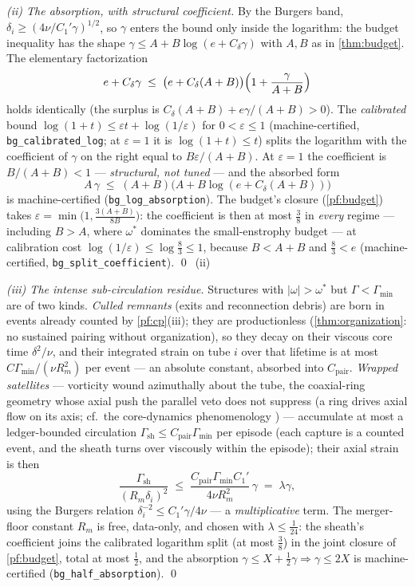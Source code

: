 \documentclass[11pt,letterpaper]{amsart}
\theoremstyle{definition}
\theoremstyle{remark}
\newcommand{\om}{\omega}
\newcommand{\abs}[1]{\lvert #1 \rvert}
\begin{document}
\emph{(ii) The absorption, with structural coefficient.} By the Burgers band,
$\delta_i\ge(4\nu/C_1'\gamma)^{1/2}$, so $\gamma$ enters the bound only inside the
logarithm: the budget inequality has the shape $\gamma\le A+B\log(e+C_\delta\gamma)$
with $A,B$ as in \cref{thm:budget}. The elementary factorization
\[
e+C_\delta\gamma\;\le\;\bigl(e+C_\delta(A+B)\bigr)\Bigl(1+\frac{\gamma}{A+B}\Bigr)
\]
holds identically (the surplus is $C_\delta(A+B)+e\gamma/(A+B)>0$). The
\emph{calibrated} bound $\log(1+t)\le\varepsilon t+\log(1/\varepsilon)$ for
$0<\varepsilon\le1$ (machine-certified, \texttt{bg\_calibrated\_log}; at
$\varepsilon=1$ it is $\log(1+t)\le t$) splits the logarithm with the coefficient
of $\gamma$ on the right equal to $B\varepsilon/(A+B)$. At $\varepsilon=1$ the
coefficient is $B/(A+B)<1$ --- \emph{structural, not tuned} --- and the absorbed form
\[
A\,\gamma\;\le\;(A+B)\bigl(A+B\log(e+C_\delta(A+B))\bigr)
\]
is machine-certified (\texttt{bg\_log\_absorption}). The budget's closure
(\cref{pf:budget}) takes $\varepsilon=\min\bigl(1,\tfrac{3(A+B)}{8B}\bigr)$: the
coefficient is then at most $\tfrac38$ in \emph{every} regime --- including $B>A$,
where $\om^*$ dominates the small-enstrophy budget --- at calibration cost
$\log(1/\varepsilon)\le\log\tfrac83\le1$, because $B<A+B$ and $\tfrac83<e$
(machine-certified, \texttt{bg\_split\_coefficient}). \qed\ (ii)

\emph{(iii) The intense sub-circulation residue.} Structures with
$\abs{\om}>\om^*$ but $\Gamma<\Gamma_{\min}$ are of two kinds. \emph{Culled remnants}
(exits and reconnection debris) are born in events already counted by
\cref{pf:cp}(iii); they are productionless (\cref{thm:organization}: no sustained
pairing without organization), so they decay on their viscous core time
$\delta^2/\nu$, and their integrated strain on tube $i$ over that lifetime is at most
$C\Gamma_{\min}/(\nu R_m^2)$ per event --- an absolute constant, absorbed into
$C_{\mathrm{pair}}$. \emph{Wrapped satellites} --- vorticity wound azimuthally about
the tube, the coaxial-ring geometry whose axial push the parallel veto does not
suppress (a ring drives axial flow on its axis; cf.\ the core-dynamics phenomenology
\cite{MelanderHussain1994}) --- accumulate at most a ledger-bounded circulation
$\Gamma_{\mathrm{sh}}\le C_{\mathrm{pair}}\Gamma_{\min}$ per episode (each capture is
a counted event, and the sheath turns over viscously within the episode); their
axial strain is then
\[
\frac{\Gamma_{\mathrm{sh}}}{(R_m\delta_i)^2}
\;\le\;\frac{C_{\mathrm{pair}}\Gamma_{\min}C_1'}{4\nu R_m^2}\,\gamma\;=\;\lambda\gamma,
\]
using the Burgers relation $\delta_i^{-2}\le C_1'\gamma/4\nu$ --- a
\emph{multiplicative} term. The merger-floor constant $R_m$ is free, data-only, and
chosen with $\lambda\le\tfrac1{24}$: the sheath's coefficient joins the calibrated
logarithm split (at most $\tfrac38$) in the joint closure of \cref{pf:budget},
total at most $\tfrac12$, and the absorption $\gamma\le X+\tfrac12\gamma\Rightarrow
\gamma\le2X$ is machine-certified (\texttt{bg\_half\_absorption}). \qed
\end{document}
